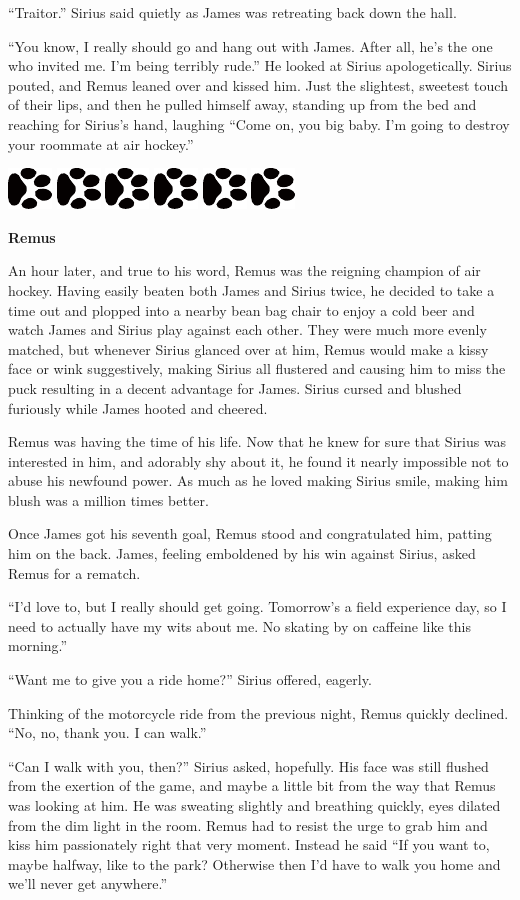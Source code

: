 \documentclass[12pt,twoside,openright]{memoir}
\newcommand{\myrulez}{	
	\begin{center}
		\hspace{.5em}
		\includegraphics[angle=60]{dogprint.pdf}
		\hspace{.5em}
		\includegraphics[angle=120]{dogprint.pdf}
		\hspace{.5em}
		\includegraphics[angle=60]{dogprint.pdf}
		\hspace{.5em}
		\includegraphics[angle=120]{dogprint.pdf}
		\hspace{.5em}
		\includegraphics[angle=60]{dogprint.pdf}
		\hspace{.5em}
		\includegraphics[angle=120]{dogprint.pdf}
		\hspace{.5em}
	\end{center}
}
\begin{document}
``Traitor.'' Sirius said quietly as James was retreating back down the hall.

``You know, I really should go and hang out with James. After all, he's the one who invited me. I'm being terribly rude.''
He looked at Sirius apologetically. Sirius pouted, and Remus leaned over and kissed him. Just the slightest, sweetest touch of their lips, and then he pulled himself away, standing up from the bed and reaching for Sirius's hand, laughing
``Come on, you big baby. I'm going to destroy your roommate at air hockey.''

\myrulez

\textbf{Remus} 

An hour later, and true to his word, Remus was the reigning champion of air hockey. Having easily beaten both James and Sirius twice, he decided to take a time out and plopped into a nearby bean bag chair to enjoy a cold beer and watch James and Sirius play against each other. They were much more evenly matched, but whenever Sirius glanced over at him, Remus would make a kissy face or wink suggestively, making Sirius all flustered and causing him to miss the puck resulting in a decent advantage for James. Sirius cursed and blushed furiously while James hooted and cheered.

Remus was having the time of his life. Now that he knew for sure that Sirius was interested in him, and adorably shy about it, he found it nearly impossible not to abuse his newfound power. As much as he loved making Sirius smile, making him blush was a million times better.

Once James got his seventh goal, Remus stood and congratulated him, patting him on the back. James, feeling emboldened by his win against Sirius, asked Remus for a rematch.

``I'd love to, but I really should get going. Tomorrow's a field experience day, so I need to actually have my wits about me. No skating by on caffeine like this morning.''

``Want me to give you a ride home?'' Sirius offered, eagerly.

Thinking of the motorcycle ride from the previous night, Remus quickly declined. ``No, no, thank you. I can walk.''

``Can I walk with you, then?'' Sirius asked, hopefully. His face was still flushed from the exertion of the game, and maybe a little bit from the way that Remus was looking at him. He was sweating slightly and breathing quickly, eyes dilated from the dim light in the room. Remus had to resist the urge to grab him and kiss him passionately right that very moment. Instead he said ``If you want to, maybe halfway, like to the park? Otherwise then I'd have to walk you home and we'll never get anywhere.''
\end{document}
